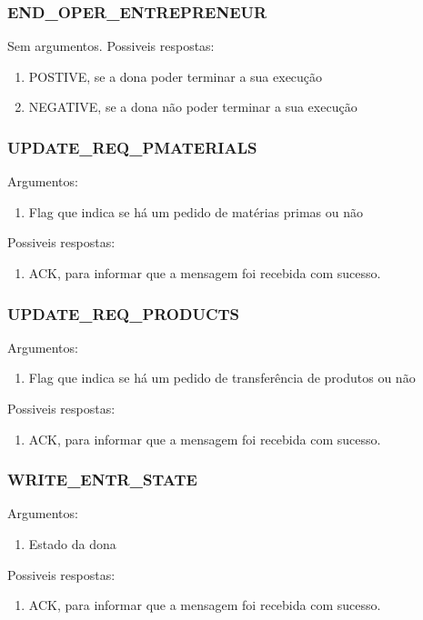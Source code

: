 \documentclass[11pt,a4paper]{report}
\begin{document}
\subsubsection{END\_OPER\_ENTREPRENEUR}
Sem argumentos.
Possiveis respostas:
\begin{enumerate}
    \itemsep-0.4em
    \item POSTIVE, se a dona poder terminar a sua execução
    \item NEGATIVE, se a dona não poder terminar a sua execução
\end{enumerate}

\subsubsection{UPDATE\_REQ\_PMATERIALS}
Argumentos:
\begin{enumerate}
    \itemsep-0.4em
    \item Flag que indica se há um pedido de matérias primas ou não
\end{enumerate}
Possiveis respostas:
\begin{enumerate}
    \itemsep-0.4em
    \item ACK, para informar que a mensagem foi recebida com sucesso.
\end{enumerate}

\subsubsection{UPDATE\_REQ\_PRODUCTS}
Argumentos:
\begin{enumerate}
    \itemsep-0.4em
    \item Flag que indica se há um pedido de transferência de produtos ou não
\end{enumerate}
Possiveis respostas:
\begin{enumerate}
    \itemsep-0.4em
    \item ACK, para informar que a mensagem foi recebida com sucesso.
\end{enumerate}

\subsubsection{WRITE\_ENTR\_STATE}
Argumentos:
\begin{enumerate}
    \itemsep-0.4em
    \item Estado da dona
\end{enumerate}
Possiveis respostas:
\begin{enumerate}
    \itemsep-0.4em
    \item ACK, para informar que a mensagem foi recebida com sucesso.
\end{enumerate}
\end{document}
